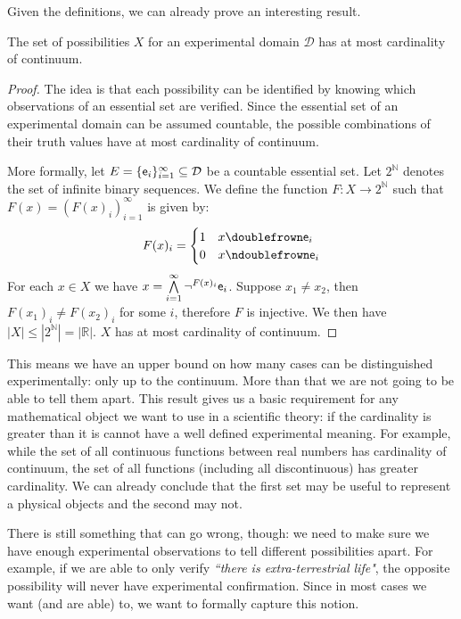 \documentclass[11pt,letterpaper,fleqn]{memoir} %
\begin{document}
Given the definitions, we can already prove an interesting result.

\begin{mathSection}
	\begin{prop}
		The set of possibilities $X$ for an experimental domain $\mathcal{D}$ has at most cardinality of continuum.
	\end{prop}
	
	\begin{proof}
		The idea is that each possibility can be identified by knowing which observations of an essential set are verified. Since the essential set of an experimental domain can be assumed countable, the possible combinations of their truth values have at most cardinality of continuum.
		
		More formally, let $E = \{\obs[e]_i\}_{i=1}^{\infty} \subseteq \mathcal{D}$ be a countable essential set. Let $2^{\mathbb{N}}$ denotes the set of infinite binary sequences. We define the function $F:X\to2^{\mathbb{N}}$ such that $F(x) = (F(x)_i)_{i=1}^{\infty}$ is given by: 
		$$
		F(x)_i = 
		\begin{cases}
		1 & x \comp \obs[e]_i \\
		0 & x \ncomp \obs[e]_i
		\end{cases}
		$$
		For each $x \in X$ we have $x = \bigAND\limits_{i=1}^{\infty} \NOT^{F(x)_i} \obs[e]_i$. Suppose $x_1 \neq x_2$, then $F(x_1)_i \neq F(x_2)_i$ for some $i$, therefore $F$ is injective. We then have $|X| \leq |2^{\mathbb{N}}|=|\mathbb{R}|$. $X$ has at most cardinality of continuum.
	\end{proof}
\end{mathSection}

This means we have an upper bound on how many cases can be distinguished experimentally: only up to the continuum. More than that we are not going to be able to tell them apart. This result gives us a basic requirement for any mathematical object we want to use in a scientific theory: if the cardinality is greater than it is cannot have a well defined experimental meaning. For example, while the set of all continuous functions between real numbers has cardinality of continuum, the set of all functions (including all discontinuous) has greater cardinality. We can already conclude that the first set may be useful to represent a physical objects and the second may not.

There is still something that can go wrong, though: we need to make sure we have enough experimental observations to tell different possibilities apart. For example, if we are able to only verify \emph{``there is extra-terrestrial life"}, the opposite possibility will never have experimental confirmation. Since in most cases we want (and are able) to, we want to formally capture this notion.
\end{document}

